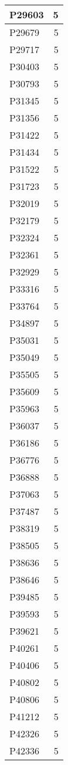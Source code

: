 \documentclass[
]{book}
\theoremstyle{definition}
\theoremstyle{definition}
\theoremstyle{definition}
\theoremstyle{definition}
\theoremstyle{remark}
\begin{document}
\begin{table}
\begin{tabular}{l|r}
\hline
P29603 & 5\\
\hline
P29679 & 5\\
\hline
P29717 & 5\\
\hline
P30403 & 5\\
\hline
P30793 & 5\\
\hline
P31345 & 5\\
\hline
P31356 & 5\\
\hline
P31422 & 5\\
\hline
P31434 & 5\\
\hline
P31522 & 5\\
\hline
P31723 & 5\\
\hline
P32019 & 5\\
\hline
P32179 & 5\\
\hline
P32324 & 5\\
\hline
P32361 & 5\\
\hline
P32929 & 5\\
\hline
P33316 & 5\\
\hline
P33764 & 5\\
\hline
P34897 & 5\\
\hline
P35031 & 5\\
\hline
P35049 & 5\\
\hline
P35505 & 5\\
\hline
P35609 & 5\\
\hline
P35963 & 5\\
\hline
P36037 & 5\\
\hline
P36186 & 5\\
\hline
P36776 & 5\\
\hline
P36888 & 5\\
\hline
P37063 & 5\\
\hline
P37487 & 5\\
\hline
P38319 & 5\\
\hline
P38505 & 5\\
\hline
P38636 & 5\\
\hline
P38646 & 5\\
\hline
P39485 & 5\\
\hline
P39593 & 5\\
\hline
P39621 & 5\\
\hline
P40261 & 5\\
\hline
P40406 & 5\\
\hline
P40802 & 5\\
\hline
P40806 & 5\\
\hline
P41212 & 5\\
\hline
P42326 & 5\\
\hline
P42336 & 5\\

\end{tabular}
\end{table}
\end{document}
